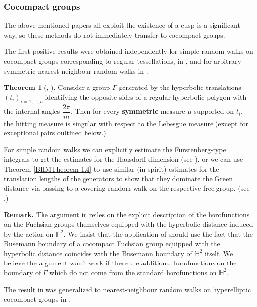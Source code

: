 \documentclass[11pt]{amsart}
\theoremstyle{definition}
\newtheorem{theorem}{Theorem}[section]
\begin{document}
	\subsubsection{Cocompact groups} 
	
	The above mentioned papers all exploit the existence of a cusp is a significant way, so these methods do not immediately transfer to cocompact groups. 
	
	The first positive results were obtained independently for simple random walks on cocompact groups corresponding to regular tessellations, in \cite{Carrasco2019OnTS}, and for arbitrary symmetric nearest-neighbour random walks in \cite{10.1093/imrn/rnaa213}.
	
	\begin{theorem}[\cite{Carrasco2019OnTS}, \cite{10.1093/imrn/rnaa213}]
		Consider a group $\Gamma$ generated by the hyperbolic translations $(t_i)_{i = 1, \dots, n}$ identifying the opposite sides of a regular hyperbolic polygon with the internal angles $\dfrac{2\pi}{m}$. Then for every \textbf{symmetric} measure $\mu$ supported on $t_i$, the hitting measure is singular with respect to the Lebesgue measure (except for exceptional pairs oultined below.)  
	\end{theorem}
	
	For simple random walks we can explicitly estimate the Furstenberg-type integrals to get the estimates for the Hausdorff dimension (see \cite{Carrasco2019OnTS}), or we can use Theorem \ref{BHMTheorem 1.4} to use similar (in spirit) estimates for the translation lengths of the generators to show that they dominate the Green distance via passing to a covering random walk on the respective free group. (see \cite{10.1093/imrn/rnaa213}.)
	
	\textbf{Remark.} The argument in \cite{Carrasco2019OnTS} reiles on the explicit description of the horofunctions on the Fuchsian groups themselves equipped with the hyperbolic distance induced by the action on $\mathbb{H}^2$. We insist that the application of \cite[Theorem 3.1]{Carrasco2019OnTS} should use the fact that the Busemann boundary of a cocompact Fuchsian group equipped with the hyperbolic distance coincides with the Busemann boundary of $\mathbb{H}^2$ itself. We believe the argument won't work if there are additional horofunctions on the boundary of $\Gamma$ which do not come from the standard horofunctions on $\mathbb{H}^2$. 
	
	The result in \cite{10.1093/imrn/rnaa213} was generalized to nearest-neighbour random walks on hyperelliptic cocompact groups in \cite{kosenko_tiozzo_2022}.
	
\end{document}
